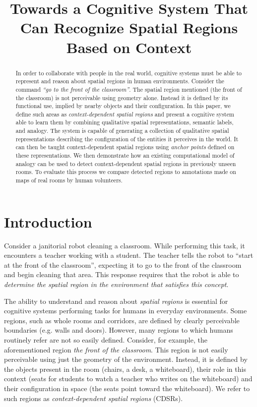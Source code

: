 \documentclass[letterpaper]{article}
\begin{document}
\title{Towards a Cognitive System That Can Recognize Spatial Regions Based on Context}

\author{}


\maketitle
\begin{abstract}
In order to collaborate with people in the real world, cognitive systems must be able to represent and reason about spatial regions in human environments. Consider the command \emph{``go to the front of the classroom''}. The spatial region mentioned (the front of the classroom) is not perceivable using geometry alone. Instead it is defined by its functional use, implied by nearby objects and their configuration. In this paper, we define such areas as \textit{context-dependent spatial regions} and present a cognitive system able to learn them by combining qualitative spatial representations, semantic labels, and analogy. The system is capable of generating a collection of qualitative spatial representations describing the configuration of the entities it perceives in the world. It can then be taught context-dependent spatial regions using \textit{anchor points} defined on these representations.  We then demonstrate how an existing computational model of analogy can be used to detect context-dependent spatial regions in previously unseen rooms. To evaluate this process we compare detected regions to annotations made on maps of real rooms by human volunteers.
\end{abstract}

\section{Introduction}

Consider a janitorial robot cleaning a classroom. While performing this task, it encounters a teacher working with a student. The teacher tells the robot to ``start at the front of the classroom'', expecting it to go to the front of the classroom and begin cleaning that area. This response requires that the robot is able to \emph{determine the spatial region in the environment that satisfies this concept}.

The ability to understand and reason about \textit{spatial regions} is essential for cognitive systems performing tasks for humans in everyday environments. Some regions, such as whole rooms and corridors, are defined by clearly perceivable boundaries (e.g. walls and doors). However, many regions to which humans routinely refer are not so easily defined. Consider, for example, the aforementioned region \textit{the front of the classroom}. This region is not easily perceivable using just the geometry of the environment. Instead, it is defined by the objects present in the room (chairs, a desk, a whiteboard), their role in this context (seats for students to watch a teacher who writes on the whiteboard) and their configuration in space (the seats point toward the whiteboard). We refer to such regions as \textit{context-dependent spatial regions} (CDSRs). 
\end{document}
